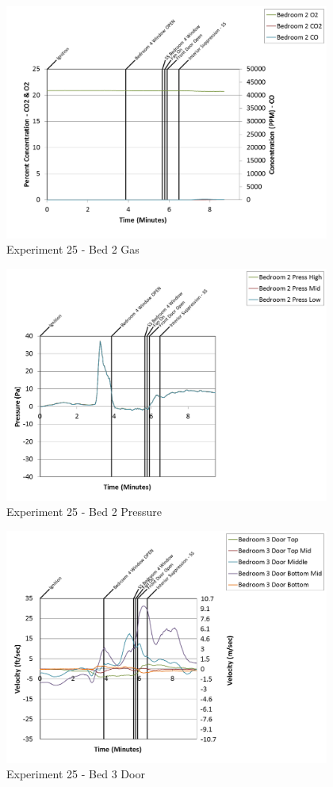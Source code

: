 \documentclass{article}
\begin{document}
\begin{appendices}
\begin{figure}[h!]
	\centering
	\includegraphics[height=3.05in]{0_Images/Results_Charts/Exp_25_Charts/Bed2Gas.png}
	\caption{Experiment 25 - Bed 2 Gas}
\end{figure}

\clearpage

\begin{figure}[h!]
	\centering
	\includegraphics[height=3.05in]{0_Images/Results_Charts/Exp_25_Charts/Bed2Pressure.png}
	\caption{Experiment 25 - Bed 2 Pressure}
\end{figure}


\begin{figure}[h!]
	\centering
	\includegraphics[height=3.05in]{0_Images/Results_Charts/Exp_25_Charts/Bed3Door.png}
	\caption{Experiment 25 - Bed 3 Door}
\end{figure}


\end{appendices}
\end{document}
